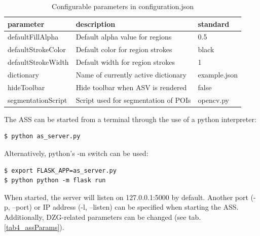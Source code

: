 \begin{table}[H]
	\begin{center}
		\begin{tabular}{| p{3cm} | p{5.5cm} | p{2cm} |}
			\hline
			\textbf{parameter} & \textbf{description} & \textbf{standard}\\ \hline
			defaultFillAlpha & Default alpha value for regions & 0.5\\ \hline
			defaultStrokeColor & Default color for region strokes & black \\ \hline
			defaultStrokeWidth & Default width for region strokes & 1 \\ \hline
			dictionary & Name of currently active dictionary & example.json\\ \hline
			hideToolbar & Hide toolbar when ASV is rendered & false\\ \hline
			segmentationScript & Script used for segmentation of POIs & opencv.py\\ \hline
		\end{tabular}
		\caption{Configurable parameters in configuration.json}
		\label{tab4_assConfig}
	\end{center}
\end{table}

The ASS can be started from a terminal through the use of a python interpreter:
\begin{lstlisting}
$ python as_server.py
\end{lstlisting}

Alternatively, python's -m switch can be used:
\begin{lstlisting}
$ export FLASK_APP=as_server.py
$ python python -m flask run
\end{lstlisting}

When started, the server will listen on 127.0.0.1:5000 by default. Another port (-p, --port) or IP address (-l, --listen) can be specified when starting the ASS. Additionally, DZG-related parameters can be changed (see tab. \ref{tab4_assParams}).

